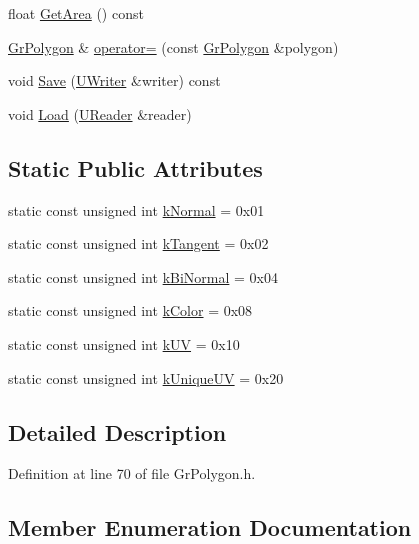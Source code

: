 \begin{CompactItemize}
\begin{CompactItemize}
\item 
float \hyperlink{class_gr_polygon_9149e2e595486a8ac0259bc469418c1f}{GetArea} () const 
\item 
\hyperlink{class_gr_polygon}{GrPolygon} \& \hyperlink{class_gr_polygon_eb49875dbda2f349029f033612a987be}{operator=} (const \hyperlink{class_gr_polygon}{GrPolygon} \&polygon)
\item 
void \hyperlink{class_gr_polygon_8124d42ce98f591b5e75c63b1adc673c}{Save} (\hyperlink{class_u_writer}{UWriter} \&writer) const 
\item 
void \hyperlink{class_gr_polygon_c9a85b2f9ebbdc644bf51e738edde549}{Load} (\hyperlink{class_u_reader}{UReader} \&reader)
\end{CompactItemize}
\subsection*{Static Public Attributes}
\begin{CompactItemize}
\item 
static const unsigned int \hyperlink{class_gr_polygon_f85991824f91a6724771e1ace01f1caf}{kNormal} = 0x01
\item 
static const unsigned int \hyperlink{class_gr_polygon_294f4e919c062a31183e59d05c2352ae}{kTangent} = 0x02
\item 
static const unsigned int \hyperlink{class_gr_polygon_8649525f9a18567bd50c87ab9436a9d9}{kBiNormal} = 0x04
\item 
static const unsigned int \hyperlink{class_gr_polygon_438f9ff37f015e22bd8e48f94637b766}{kColor} = 0x08
\item 
static const unsigned int \hyperlink{class_gr_polygon_f61ee04e7a4e4e076f5e4beb223d8fbc}{kUV} = 0x10
\item 
static const unsigned int \hyperlink{class_gr_polygon_a21eb256bb71553f0d7d9780371c21d0}{kUniqueUV} = 0x20
\end{CompactItemize}


\subsection{Detailed Description}


Definition at line 70 of file GrPolygon.h.

\subsection{Member Enumeration Documentation}
\hypertarget{class_gr_polygon_836e951bdd2b98548ff07a856432365c}{
}
\end{CompactItemize}
